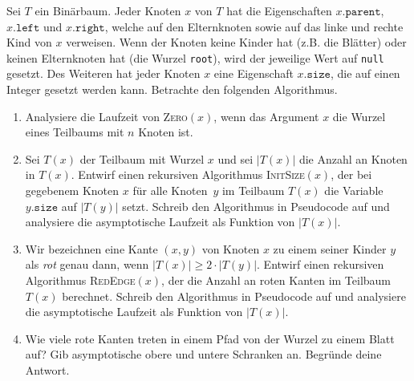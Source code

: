 \documentclass{uebung_cs}
\begin{document}
\begin{aufgabe}
  Sei $T$ ein Binärbaum.
  Jeder Knoten $x$ von $T$ hat die Eigenschaften $x.\texttt{parent}$, $x.\texttt{left}$ und $x.\texttt{right}$, welche auf den Elternknoten sowie auf das linke und rechte Kind von $x$ verweisen.
  Wenn der Knoten keine Kinder hat (z.B. die Blätter) oder keinen Elternknoten hat (die Wurzel \texttt{root}), wird der jeweilige Wert auf \texttt{null} gesetzt.
  Des Weiteren hat jeder Knoten $x$ eine Eigenschaft $x.\texttt{size}$, die auf einen Integer gesetzt werden kann.
  Betrachte den folgenden Algorithmus.
  \begin{algorithmic}
      \EndIf
      \EndProcedure
  \end{algorithmic}
  \begin{enumerate}
      \item \bestehen Analysiere die Laufzeit von \textsc{Zero}$(x)$, wenn das Argument $x$ die Wurzel eines Teilbaums mit $n$ Knoten ist.
      \item \mittel Sei $T(x)$ der Teilbaum mit Wurzel $x$ und sei $|T(x)|$ die Anzahl an Knoten in $T(x)$.
      Entwirf einen rekursiven Algorithmus \textsc{InitSize$(x)$}, der bei gegebenem Knoten $x$ für alle Knoten~$y$ im Teilbaum $T(x)$ die Variable $y.\texttt{size}$ auf $|T(y)|$ setzt.
      Schreib den Algorithmus in Pseudocode auf und analysiere die asymptotische Laufzeit als Funktion von $|T(x)|$.
      \item \mittel Wir bezeichnen eine Kante $(x,y)$ von Knoten $x$ zu einem seiner Kinder $y$ als \emph{rot} genau dann, wenn $|T(x)| \geq 2\cdot|T(y)|$.
      Entwirf einen rekursiven Algorithmus \textsc{RedEdge$(x)$}, der die Anzahl an roten Kanten im Teilbaum $T(x)$ berechnet.
      Schreib den Algorithmus in Pseudocode auf und analysiere die asymptotische Laufzeit als Funktion von $|T(x)|$.
      \item \mittel Wie viele rote Kanten treten in einem Pfad von der Wurzel zu einem Blatt auf?
      Gib asymptotische obere und untere Schranken an. Begründe deine Antwort.
  \end{enumerate}

\end{aufgabe}
\end{document}
